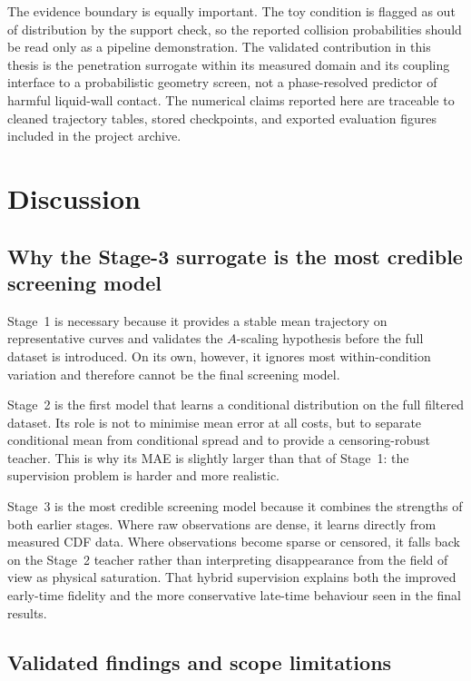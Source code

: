 \documentclass[english, 12pt, a4paper, elec, utf8, a-2b, online]{aaltothesis}
\begin{document}
The evidence boundary is equally important. The toy condition is flagged as out of distribution by the support check, so the reported collision probabilities should be read only as a pipeline demonstration. The validated contribution in this thesis is the penetration surrogate within its measured domain and its coupling interface to a probabilistic geometry screen, not a phase-resolved predictor of harmful liquid-wall contact. The numerical claims reported here are traceable to cleaned trajectory tables, stored checkpoints, and exported evaluation figures included in the project archive.

\section{Discussion}

\subsection{Why the Stage-3 surrogate is the most credible screening model}

Stage~1 is necessary because it provides a stable mean trajectory on representative curves and validates the $A$-scaling hypothesis before the full dataset is introduced. On its own, however, it ignores most within-condition variation and therefore cannot be the final screening model.

Stage~2 is the first model that learns a conditional distribution on the full filtered dataset. Its role is not to minimise mean error at all costs, but to separate conditional mean from conditional spread and to provide a censoring-robust teacher. This is why its MAE is slightly larger than that of Stage~1: the supervision problem is harder and more realistic.

Stage~3 is the most credible screening model because it combines the strengths of both earlier stages. Where raw observations are dense, it learns directly from measured CDF data. Where observations become sparse or censored, it falls back on the Stage~2 teacher rather than interpreting disappearance from the field of view as physical saturation. That hybrid supervision explains both the improved early-time fidelity and the more conservative late-time behaviour seen in the final results.

\subsection{Validated findings and scope limitations}
\end{document}
